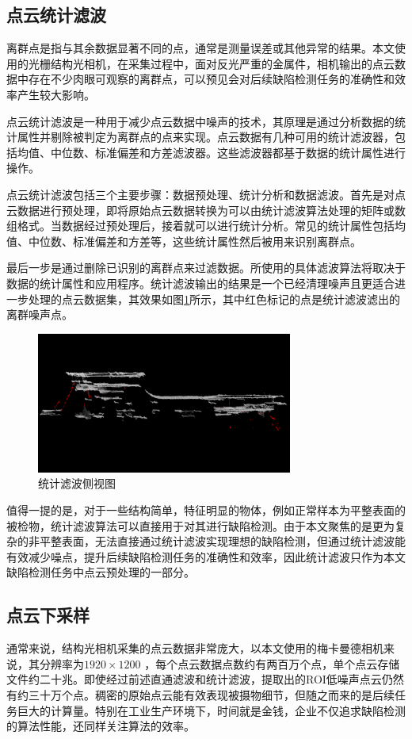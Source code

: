 \subsection{点云统计滤波}
离群点是指与其余数据显著不同的点，通常是测量误差或其他异常的结果。本文使用的光栅结构光相机，在采集过程中，面对反光严重的金属件，相机输出的点云数据中存在不少肉眼可观察的离群点，可以预见会对后续缺陷检测任务的准确性和效率产生较大影响。

点云统计滤波是一种用于减少点云数据中噪声的技术，其原理是通过分析数据的统计属性并剔除被判定为离群点的点来实现。点云数据有几种可用的统计滤波器，包括均值、中位数、标准偏差和方差滤波器。这些滤波器都基于数据的统计属性进行操作。

点云统计滤波包括三个主要步骤：数据预处理、统计分析和数据滤波。首先是对点云数据进行预处理，即将原始点云数据转换为可以由统计滤波算法处理的矩阵或数组格式。当数据经过预处理后，接着就可以进行统计分析。常见的统计属性包括均值、中位数、标准偏差和方差等，这些统计属性然后被用来识别离群点。

最后一步是通过删除已识别的离群点来过滤数据。所使用的具体滤波算法将取决于数据的统计属性和应用程序。统计滤波输出的结果是一个已经清理噪声且更适合进一步处理的点云数据集，其效果如图\ref{fig:statistic}所示，其中红色标记的点是统计滤波滤出的离群噪声点。
\begin{figure}[htbp]
    \centering
    \includegraphics[width=0.75\textwidth]{figures/statistic.png}
    \caption{统计滤波侧视图}
    \label{fig:statistic}
\end{figure}

值得一提的是，对于一些结构简单，特征明显的物体，例如正常样本为平整表面的被检物，统计滤波算法可以直接用于对其进行缺陷检测。由于本文聚焦的是更为复杂的非平整表面，无法直接通过统计滤波实现理想的缺陷检测，但通过统计滤波能有效减少噪点，提升后续缺陷检测任务的准确性和效率，因此统计滤波只作为本文缺陷检测任务中点云预处理的一部分。


\subsection{点云下采样}
通常来说，结构光相机采集的点云数据非常庞大，以本文使用的梅卡曼德相机来说，其分辨率为$1920 \times1200$ ，每个点云数据点数约有两百万个点，单个点云存储文件约二十兆。即使经过前述直通滤波和统计滤波，提取出的ROI低噪声点云仍然有约三十万个点。稠密的原始点云能有效表现被摄物细节，但随之而来的是后续任务巨大的计算量。特别在工业生产环境下，时间就是金钱，企业不仅追求缺陷检测的算法性能，还同样关注算法的效率。

